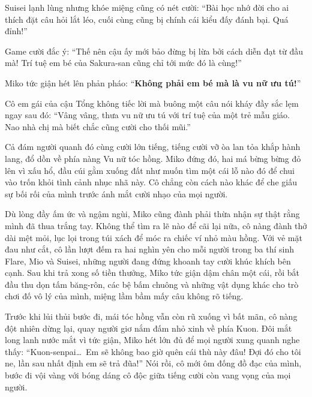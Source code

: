 \documentclass[../main.tex]{subfiles}
\begin{document}
Suisei lạnh lùng nhưng khóe miệng cũng có nét cười: ``Bài học nhớ đời cho ai thích đặt câu hỏi lắt léo, cuối cùng cũng bị chính cái kiểu đấy đánh bại. Quá đỉnh!''

Game cười đắc ý: ``Thế nên cậu ấy mới bảo đừng bị lừa bởi cách diễn đạt từ đầu mà! Trí tuệ em bé của Sakura-san cũng chỉ tới mức đó là cùng!''

Miko tức giận hét lên phản pháo: ``\textbf{Không phải em bé mà là vu nữ ưu tú!}''

Cô em gái của cậu Tổng không tiếc lời mà buông một câu nói kháy đầy sắc lẹm ngay sau đó: ``Vâng vâng, thưa vu nữ ưu tú với trí tuệ của một trẻ mẫu giáo. Nao nhà chị mà biết chắc cũng cười cho thối mũi.''

Cả đám người quanh đó cùng cười lớn tiếng, tiếng cười vỡ òa lan tỏa khắp hành lang, đổ dồn về phía nàng Vu nữ tóc hồng. Miko đứng đó, hai má bừng bừng đỏ lên vì xấu hổ, đầu cúi gằm xuống đất như muốn tìm một cái lỗ nào đó để chui vào trốn khỏi tình cảnh nhục nhã này. Cô chẳng còn cách nào khác để che giấu sự bối rối của mình trước ánh mắt cười nhạo của mọi người.

Dù lòng đầy ấm ức và ngậm ngùi, Miko cũng đành phải thừa nhận sự thật rằng mình đã thua trắng tay. Không thể tìm ra lẽ nào để cãi lại nữa, cô nàng đành thở dài mệt mỏi, lục lọi trong túi xách để móc ra chiếc ví nhỏ màu hồng. Với vẻ mặt đau như cắt, cô lần lượt đếm ra hai nghìn yên cho mỗi người trong ba thí sinh Flare, Mio và Suisei, những người đang đứng khoanh tay cười khúc khích bên cạnh. Sau khi trả xong số tiền thưởng, Miko tức giận dậm chân một cái, rồi bắt đầu thu dọn tấm băng-rôn, các bệ bấm chuông và những vật dụng khác cho trò chơi đố vô lý của mình, miệng lầm bầm mấy câu không rõ tiếng.

Trước khi lủi thủi bước đi, mái tóc hồng vẫn còn rũ xuống vì bất mãn, cô nàng đột nhiên dừng lại, quay người giơ nắm đấm nhỏ xinh về phía Kuon. Đôi mắt long lanh nước mắt vì tức giận, Miko hét lớn đủ để mọi người xung quanh nghe thấy: ``Kuon-senpai\dots\ Em sẽ không bao giờ quên cái thù này đâu! Đợi đó cho tôi ne, lần sau nhất định em sẽ trả đũa!'' Nói rồi, cô mới ôm đống đồ đạc của mình, bước đi vội vàng với bóng dáng cô độc giữa tiếng cười còn vang vọng của mọi người.
\end{document}
